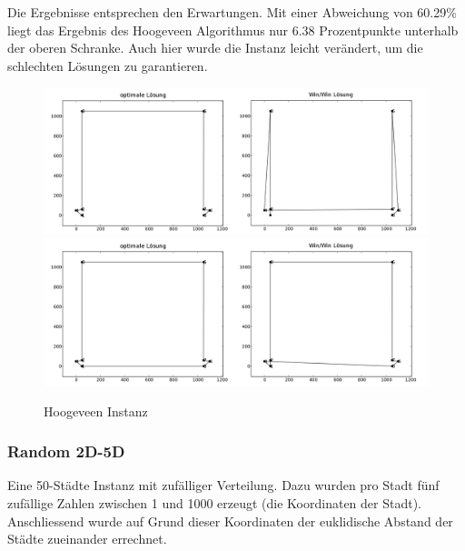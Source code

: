 \documentclass[11pt,a4paper]{article}
\begin{document}
Die Ergebnisse entsprechen den Erwartungen. Mit einer Abweichung von 60.29\% liegt das Ergebnis des Hoogeveen Algorithmus nur 6.38 Prozentpunkte unterhalb der oberen Schranke. Auch hier wurde die Instanz leicht verändert, um die schlechten Lösungen zu garantieren.

\begin{figure}[H]
        \centering
        \includegraphics[width=15cm]{gfx/hoogeveen_hpp_comparison}
        \includegraphics[width=15cm]{gfx/hoogeveen_tsp_comparison}
        \caption{Hoogeveen Instanz}
        \label{img:hoogeveen_comparison}
\end{figure}

\subsubsection{Random 2D-5D}
Eine 50-Städte Instanz mit zufälliger Verteilung. Dazu wurden pro Stadt fünf zufällige Zahlen zwischen 1 und 1000 erzeugt (die Koordinaten der Stadt). Anschliessend wurde auf Grund dieser Koordinaten der euklidische Abstand der Städte zueinander errechnet.
\end{document}
